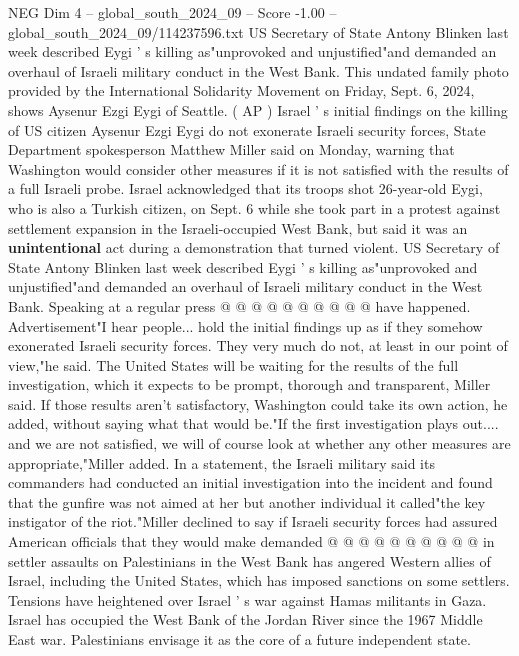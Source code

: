 \begin{textsample}{NEG Dim 4 – global\_south\_2024\_09 – Score -1.00 – global\_south\_2024\_09/114237596.txt}  \label{ex:f4_neg_181}
US Secretary of State Antony Blinken last week described Eygi ' s killing as"unprovoked and unjustified"and demanded an overhaul of Israeli military conduct in the West Bank.
This undated family photo provided by the International Solidarity Movement on Friday, Sept. 6, 2024, shows Aysenur Ezgi Eygi of Seattle. ( AP ) Israel ' s initial findings on the killing of US citizen Aysenur Ezgi Eygi do not exonerate Israeli security forces, State Department spokesperson Matthew Miller said on Monday, warning that Washington would consider other measures if it is not satisfied with the results of a full Israeli probe.
Israel acknowledged that its troops shot 26-year-old Eygi, who is also a Turkish citizen, on Sept. 6 while she took part in a protest against settlement expansion in the Israeli-occupied West Bank, but said it was an \textbf{unintentional} act during a demonstration that turned violent.
US Secretary of State Antony Blinken last week described Eygi ' s killing as"unprovoked and unjustified"and demanded an overhaul of Israeli military conduct in the West Bank.
Speaking at a regular press @ @ @ @ @ @ @ @ @ @ have happened.
Advertisement"I hear people... hold the initial findings up as if they somehow exonerated Israeli security forces.
They very much do not, at least in our point of view,"he said.
The United States will be waiting for the results of the full investigation, which it expects to be prompt, thorough and transparent, Miller said.
If those results aren't satisfactory, Washington could take its own action, he added, without saying what that would be."If the first investigation plays out.... and we are not satisfied, we will of course look at whether any other measures are appropriate,"Miller added.
In a statement, the Israeli military said its commanders had conducted an initial investigation into the incident and found that the gunfire was not aimed at her but another individual it called"the key instigator of the riot."Miller declined to say if Israeli security forces had assured American officials that they would make demanded @ @ @ @ @ @ @ @ @ @ in settler assaults on Palestinians in the West Bank has angered Western allies of Israel, including the United States, which has imposed sanctions on some settlers.
Tensions have heightened over Israel ' s war against Hamas militants in Gaza.
Israel has occupied the West Bank of the Jordan River since the 1967 Middle East war.
Palestinians envisage it as the core of a future independent state.

\end{textsample}
